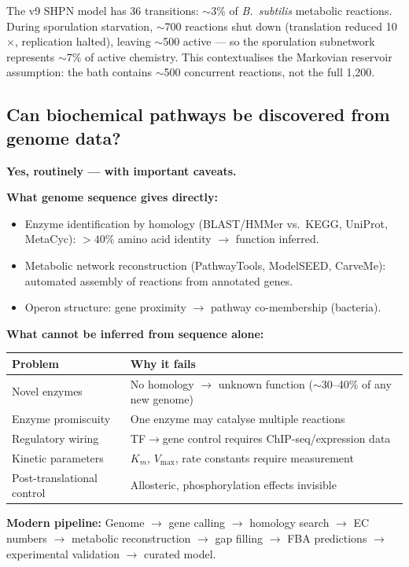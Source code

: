 \documentclass[11pt,a4paper]{article}
\begin{document}
The v9 SHPN model has 36 transitions: $\sim$3\% of \textit{B.~subtilis}
metabolic reactions.
During sporulation starvation, $\sim$700 reactions shut down (translation
reduced 10$\times$, replication halted), leaving $\sim$500 active ---
so the sporulation subnetwork represents $\sim$7\% of active chemistry.
This contextualises the Markovian reservoir assumption: the bath contains
$\sim$500 concurrent reactions, not the full 1,200.

\subsection*{Can biochemical pathways be discovered from genome data?}

\textbf{Yes, routinely --- with important caveats.}

\textbf{What genome sequence gives directly:}
\begin{itemize}
  \item Enzyme identification by homology (BLAST/HMMer vs.\ KEGG, UniProt,
    MetaCyc): $>40\%$ amino acid identity $\to$ function inferred.
  \item Metabolic network reconstruction (PathwayTools, ModelSEED,
    CarveMe): automated assembly of reactions from annotated genes.
  \item Operon structure: gene proximity $\to$ pathway co-membership
    (bacteria).
\end{itemize}

\textbf{What cannot be inferred from sequence alone:}
\begin{center}
\begin{tabular}{ll}
\toprule
Problem & Why it fails \\
\midrule
Novel enzymes & No homology $\to$ unknown function ($\sim$30--40\% of
  any new genome) \\
Enzyme promiscuity & One enzyme may catalyse multiple reactions \\
Regulatory wiring & TF$\to$gene control requires ChIP-seq/expression data \\
Kinetic parameters & $K_m$, $V_{\max}$, rate constants require measurement \\
Post-translational control & Allosteric, phosphorylation effects invisible \\
\bottomrule
\end{tabular}
\end{center}

\textbf{Modern pipeline:}
Genome $\to$ gene calling $\to$ homology search $\to$ EC numbers $\to$
metabolic reconstruction $\to$ gap filling $\to$ FBA predictions $\to$
experimental validation $\to$ curated model.
\end{document}
